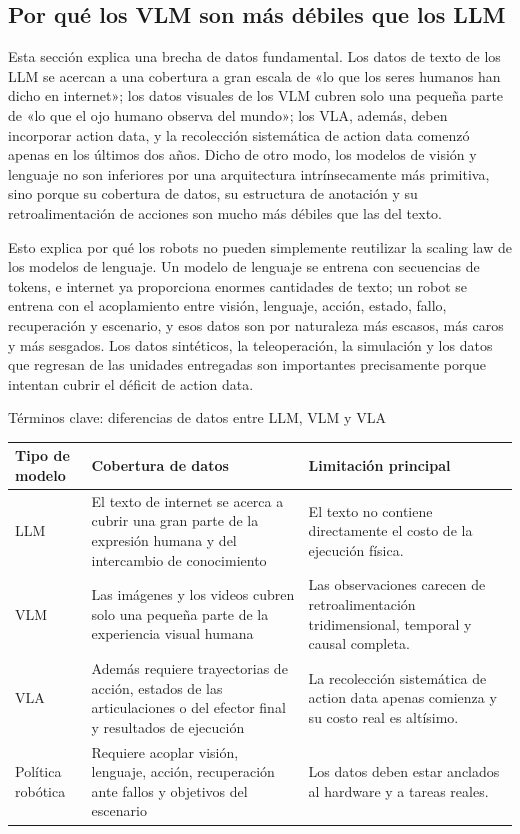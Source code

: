 \subsection{Por qué los VLM son más débiles que los LLM}

Esta sección explica una brecha de datos fundamental. Los datos de texto de los LLM se acercan a una cobertura a gran escala de «lo que los seres humanos han dicho en internet»; los datos visuales de los VLM cubren solo una pequeña parte de «lo que el ojo humano observa del mundo»; los VLA, además, deben incorporar action data, y la recolección sistemática de action data comenzó apenas en los últimos dos años. Dicho de otro modo, los modelos de visión y lenguaje no son inferiores por una arquitectura intrínsecamente más primitiva, sino porque su cobertura de datos, su estructura de anotación y su retroalimentación de acciones son mucho más débiles que las del texto.

Esto explica por qué los robots no pueden simplemente reutilizar la scaling law de los modelos de lenguaje. Un modelo de lenguaje se entrena con secuencias de tokens, e internet ya proporciona enormes cantidades de texto; un robot se entrena con el acoplamiento entre visión, lenguaje, acción, estado, fallo, recuperación y escenario, y esos datos son por naturaleza más escasos, más caros y más sesgados. Los datos sintéticos, la teleoperación, la simulación y los datos que regresan de las unidades entregadas son importantes precisamente porque intentan cubrir el déficit de action data.

\begin{knowledgebox}{Términos clave: diferencias de datos entre LLM, VLM y VLA}
\begin{tabularx}{\textwidth}{p{}p{}X}
\toprule
Tipo de modelo & Cobertura de datos & Limitación principal \\
\midrule
LLM & El texto de internet se acerca a cubrir una gran parte de la expresión humana y del intercambio de conocimiento & El texto no contiene directamente el costo de la ejecución física. \\
VLM & Las imágenes y los videos cubren solo una pequeña parte de la experiencia visual humana & Las observaciones carecen de retroalimentación tridimensional, temporal y causal completa. \\
VLA & Además requiere trayectorias de acción, estados de las articulaciones o del efector final y resultados de ejecución & La recolección sistemática de action data apenas comienza y su costo real es altísimo. \\
Política robótica & Requiere acoplar visión, lenguaje, acción, recuperación ante fallos y objetivos del escenario & Los datos deben estar anclados al hardware y a tareas reales. \\
\bottomrule
\end{tabularx}
\end{knowledgebox}

